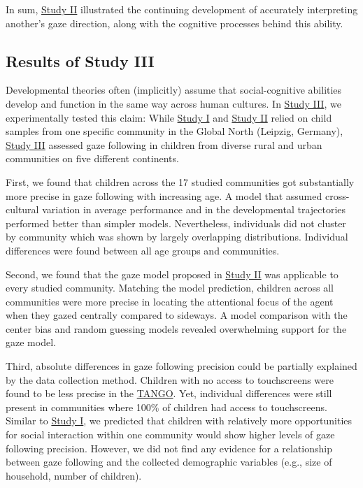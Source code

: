 \documentclass[
]{scrbook}
\begin{document}
In sum, \hyperref[studyII]{Study II} illustrated the continuing development of accurately interpreting another's gaze direction, along with the cognitive processes behind this ability.

\subsection{Results of Study III}\label{resultsIII}

Developmental theories often (implicitly) assume that social-cognitive abilities develop and function in the same way across human cultures. In \hyperref[studyIII]{Study III}, we experimentally tested this claim: While \hyperref[studyI]{Study I} and \hyperref[studyII]{Study II} relied on child samples from one specific community in the Global North (Leipzig, Germany), \hyperref[studyIII]{Study III} assessed gaze following in children from diverse rural and urban communities on five different continents.

First, we found that children across the 17 studied communities got substantially more precise in gaze following with increasing age. A model that assumed cross-cultural variation in average performance and in the developmental trajectories performed better than simpler models. Nevertheless, individuals did not cluster by community which was shown by largely overlapping distributions. Individual differences were found between all age groups and communities.

Second, we found that the gaze model proposed in \hyperref[studyII]{Study II} was applicable to every studied community. Matching the model prediction, children across all communities were more precise in locating the attentional focus of the agent when they gazed centrally compared to sideways. A model comparison with the center bias and random guessing models revealed overwhelming support for the gaze model.

Third, absolute differences in gaze following precision could be partially explained by the data collection method. Children with no access to touchscreens were found to be less precise in the \hyperref[acronyms_TANGO]{TANGO}. Yet, individual differences were still present in communities where 100\% of children had access to touchscreens. Similar to \hyperref[studyI]{Study I}, we predicted that children with relatively more opportunities for social interaction within one community would show higher levels of gaze following precision. However, we did not find any evidence for a relationship between gaze following and the collected demographic variables (e.g., size of household, number of children).
\end{document}

